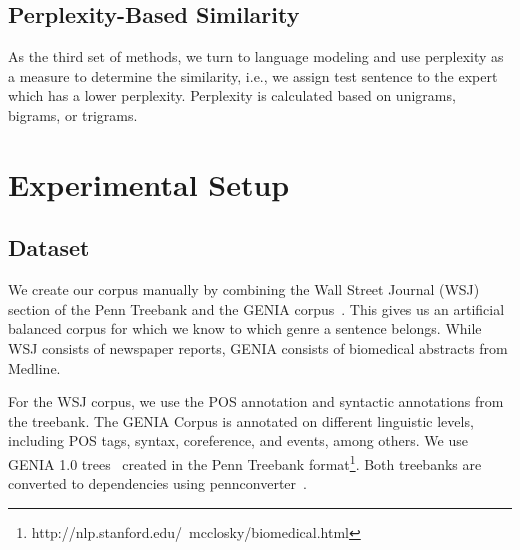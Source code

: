     






\subsection{Perplexity-Based Similarity}

As the third set of methods, we turn to language modeling and use perplexity as a measure to determine the similarity, i.e., we assign test sentence to the expert which has a lower perplexity. Perplexity is calculated based on unigrams, bigrams, or trigrams.


\section{Experimental Setup} \label{exptsetup}

\subsection{Dataset}

We create our corpus manually by combining the Wall Street Journal (WSJ)~\cite{marcus:kim:ea:94} section of the Penn Treebank and the GENIA corpus~\cite{tateisi:tsujii:04}. This gives us an artificial balanced corpus for which we know to which genre a sentence belongs.  While WSJ consists of newspaper reports, GENIA consists of biomedical abstracts from Medline.


For the WSJ corpus, we use the POS annotation and syntactic annotations  from the treebank. The GENIA Corpus is annotated on different linguistic levels, including POS tags, syntax, coreference, and events, among others. We use GENIA 1.0 trees~\cite{Ohta:2002:GCA:1289189.1289260} created in the Penn Treebank format\footnote{http://nlp.stanford.edu/~mcclosky/biomedical.html}. Both treebanks are converted to dependencies using pennconverter~\cite{johansson2007a}.

